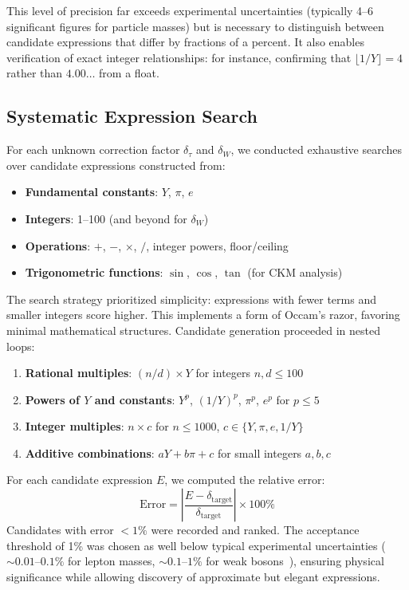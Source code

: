 \documentclass[11pt,a4paper]{article}
\begin{document}
This level of precision far exceeds experimental uncertainties (typically 4--6 significant figures for particle masses) but is necessary to distinguish between candidate expressions that differ by fractions of a percent. It also enables verification of exact integer relationships: for instance, confirming that $\lfloor 1/Y \rfloor = 4$ rather than $4.00\ldots$ from a float.

\subsection{Systematic Expression Search}

For each unknown correction factor $\delta_\tau$ and $\delta_W$, we conducted exhaustive searches over candidate expressions constructed from:
\begin{itemize}
\item \textbf{Fundamental constants}: $Y$, $\pi$, $e$
\item \textbf{Integers}: 1--100 (and beyond for $\delta_W$)
\item \textbf{Operations}: $+$, $-$, $\times$, $/$, integer powers, floor/ceiling
\item \textbf{Trigonometric functions}: $\sin$, $\cos$, $\tan$ (for CKM analysis)
\end{itemize}

The search strategy prioritized simplicity: expressions with fewer terms and smaller integers score higher. This implements a form of Occam's razor, favoring minimal mathematical structures. Candidate generation proceeded in nested loops:
\begin{enumerate}
\item \textbf{Rational multiples}: $(n/d) \times Y$ for integers $n, d \le 100$
\item \textbf{Powers of $Y$ and constants}: $Y^p$, $(1/Y)^p$, $\pi^p$, $e^p$ for $p \le 5$
\item \textbf{Integer multiples}: $n \times c$ for $n \le 1000$, $c \in \{Y, \pi, e, 1/Y\}$
\item \textbf{Additive combinations}: $a Y + b \pi + c$ for small integers $a, b, c$
\end{enumerate}

For each candidate expression $E$, we computed the relative error:
\begin{equation}
\text{Error} = \left| \frac{E - \delta_{\text{target}}}{\delta_{\text{target}}} \right| \times 100\%
\end{equation}
Candidates with error $<1\%$ were recorded and ranked. The acceptance threshold of 1\% was chosen as well below typical experimental uncertainties ($\sim 0.01$--$0.1\%$ for lepton masses, $\sim 0.1$--$1\%$ for weak bosons~\cite{ref007}), ensuring physical significance while allowing discovery of approximate but elegant expressions.
\end{document}
